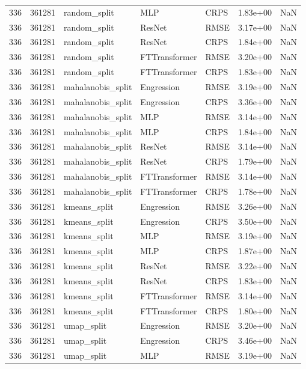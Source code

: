 \begin{tabular}{rrlllrr}
336 & 361281 & random\_split & MLP & CRPS & 1.83e+00 & NaN \\
336 & 361281 & random\_split & ResNet & RMSE & 3.17e+00 & NaN \\
336 & 361281 & random\_split & ResNet & CRPS & 1.84e+00 & NaN \\
336 & 361281 & random\_split & FTTransformer & RMSE & 3.20e+00 & NaN \\
336 & 361281 & random\_split & FTTransformer & CRPS & 1.83e+00 & NaN \\
336 & 361281 & mahalanobis\_split & Engression & RMSE & 3.19e+00 & NaN \\
336 & 361281 & mahalanobis\_split & Engression & CRPS & 3.36e+00 & NaN \\
336 & 361281 & mahalanobis\_split & MLP & RMSE & 3.14e+00 & NaN \\
336 & 361281 & mahalanobis\_split & MLP & CRPS & 1.84e+00 & NaN \\
336 & 361281 & mahalanobis\_split & ResNet & RMSE & 3.14e+00 & NaN \\
336 & 361281 & mahalanobis\_split & ResNet & CRPS & 1.79e+00 & NaN \\
336 & 361281 & mahalanobis\_split & FTTransformer & RMSE & 3.14e+00 & NaN \\
336 & 361281 & mahalanobis\_split & FTTransformer & CRPS & 1.78e+00 & NaN \\
336 & 361281 & kmeans\_split & Engression & RMSE & 3.26e+00 & NaN \\
336 & 361281 & kmeans\_split & Engression & CRPS & 3.50e+00 & NaN \\
336 & 361281 & kmeans\_split & MLP & RMSE & 3.19e+00 & NaN \\
336 & 361281 & kmeans\_split & MLP & CRPS & 1.87e+00 & NaN \\
336 & 361281 & kmeans\_split & ResNet & RMSE & 3.22e+00 & NaN \\
336 & 361281 & kmeans\_split & ResNet & CRPS & 1.83e+00 & NaN \\
336 & 361281 & kmeans\_split & FTTransformer & RMSE & 3.14e+00 & NaN \\
336 & 361281 & kmeans\_split & FTTransformer & CRPS & 1.80e+00 & NaN \\
336 & 361281 & umap\_split & Engression & RMSE & 3.20e+00 & NaN \\
336 & 361281 & umap\_split & Engression & CRPS & 3.46e+00 & NaN \\
336 & 361281 & umap\_split & MLP & RMSE & 3.19e+00 & NaN \\

\end{tabular}
